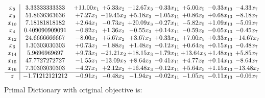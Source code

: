 \documentclass[9pt]{article}
\begin{document}
\[\begin{array}{c| c c@{\hskip 2pt} c@{\hskip 2pt} c@{\hskip 2pt} c@{\hskip 2pt} c@{\hskip 2pt} c@{\hskip 2pt} c@{\hskip 2pt} }
 x_{8}   &  3.33333333333 & + 11.00 x_{1} & +  5.33 x_{2} & -12.67 x_{3} & -0.33 x_{11} & +  5.00 x_{5} & -0.33 x_{13} & -4.33 x_{7}\\
 x_{9}   &  51.8636363636 & +  7.27 x_{1} & -19.45 x_{2} & +  5.18 x_{3} & -1.05 x_{11} & +  0.86 x_{5} & +  0.68 x_{13} & -8.18 x_{7}\\
 x_{10}   &  7.18181818182 & +  2.64 x_{1} & -0.73 x_{2} & + 20.09 x_{3} & -0.27 x_{11} & -5.82 x_{5} & +  1.09 x_{13} & -5.09 x_{7}\\
 x_{4}   &  0.409090909091 & -0.82 x_{1} & +  1.36 x_{2} & -0.55 x_{3} & +  0.14 x_{11} & -0.59 x_{5} & -0.05 x_{13} & -0.45 x_{7}\\
 x_{12}   &  24.6666666667 & -8.00 x_{1} & +  5.67 x_{2} & +  3.67 x_{3} & +  0.33 x_{11} & +  7.00 x_{5} & +  0.33 x_{13} & -14.67 x_{7}\\
 x_{6}   &  1.30303030303 & +  0.73 x_{1} & -1.88 x_{2} & +  1.48 x_{3} & -0.12 x_{11} & +  0.64 x_{5} & +  0.15 x_{13} & -0.48 x_{7}\\
 x_{14}   &  5.9696969697 & +  9.73 x_{1} & -21.21 x_{2} & + 18.15 x_{3} & -1.79 x_{11} & + 13.64 x_{5} & +  1.48 x_{13} & +  5.85 x_{7}\\
 x_{15}   &  47.7727272727 & -1.55 x_{1} & -13.09 x_{2} & +  8.64 x_{3} & -0.41 x_{11} & +  4.77 x_{5} & +  0.14 x_{13} & -8.64 x_{7}\\
 x_{16}   &  7.30303030303 & -4.27 x_{1} & +  2.12 x_{2} & + 16.48 x_{3} & -0.12 x_{11} & +  5.64 x_{5} & +  1.15 x_{13} & -13.48 x_{7}\\
\hline
z    &  -1.71212121212 & -0.91 x_{1} & -0.48 x_{2} & -1.94 x_{3} & -0.02 x_{11} & -1.05 x_{5} & -0.11 x_{13} & -0.06 x_{7}\\
\end{array}\]
Primal Dictionary with original objective is:
\end{document}
